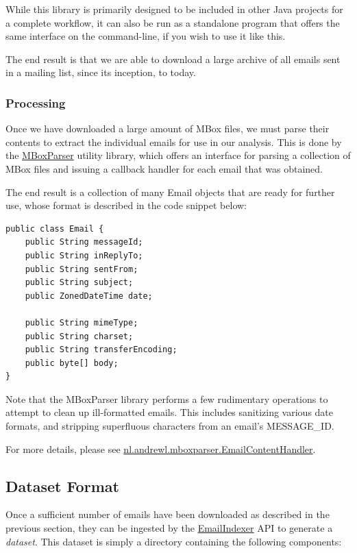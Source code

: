 \documentclass[a4paper, 12pt]{article}
\begin{document}
			While this library is primarily designed to be included in other Java projects for a complete workflow, it can also be run as a standalone program that offers the same interface on the command-line, if you wish to use it like this.
			
			The end result is that we are able to download a large archive of all emails sent in a mailing list, since its inception, to today.
			
		\subsubsection{Processing}
			Once we have downloaded a large amount of MBox files, we must parse their contents to extract the individual emails for use in our analysis. This is done by the \href{https://github.com/ArchitecturalKnowledgeAnalysis/MBoxParser}{MBoxParser} utility library, which offers an interface for parsing a collection of MBox files and issuing a callback handler for each email that was obtained.
			
			The end result is a collection of many Email objects that are ready for further use, whose format is described in the code snippet below:
			\begin{verbatim}
public class Email {
	public String messageId;
	public String inReplyTo;
	public String sentFrom;
	public String subject;
	public ZonedDateTime date;
	
	public String mimeType;
	public String charset;
	public String transferEncoding;
	public byte[] body;
}
			\end{verbatim}
		
			\footnotesize
			Note that the MBoxParser library performs a few rudimentary operations to attempt to clean up ill-formatted emails. This includes sanitizing various date formats, and stripping superfluous characters from an email's MESSAGE\_ID.
			
			For more details, please see \href{https://github.com/ArchitecturalKnowledgeAnalysis/MBoxParser/blob/main/src/main/java/nl/andrewl/mboxparser/EmailContentHandler.java}{nl.andrewl.mboxparser.EmailContentHandler}.
			\normalsize
			
	\subsection{Dataset Format}
		Once a sufficient number of emails have been downloaded as described in the previous section, they can be ingested by the \href{https://github.com/ArchitecturalKnowledgeAnalysis/EmailIndexer}{EmailIndexer} API to generate a \textit{dataset}. This dataset is simply a directory containing the following components:
		
\end{document}
